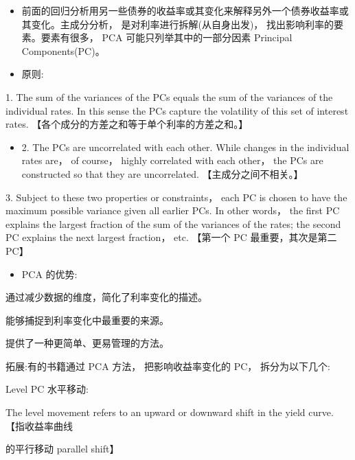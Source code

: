 \begin{itemize}
\item 前面的回归分析用另一些债券的收益率或其变化来解释另外一个债券收益率或其变化。主成分分析， 是对利率进行拆解(从自身出发)， 找出影响利率的要素。要素有很多， PCA 可能只列举其中的一部分因素 Principal Components(PC)。
\end{itemize}

\begin{itemize}
\item 原则:
\end{itemize}

1. The sum of the variances of the PCs equals the sum of the variances of the individual rates. In this sense the PCs capture the volatility of this set of interest rates. 【各个成分的方差之和等于单个利率的方差之和。】

\begin{itemize}
\item 2. The PCs are uncorrelated with each other. While changes in the individual rates are， of course， highly correlated with each other， the PCs are constructed so that they are uncorrelated. 【主成分之间不相关。】
\end{itemize}

3. Subject to these two properties or constraints， each PC is chosen to have the maximum possible variance given all earlier PCs. In other words， the first PC explains the largest fraction of the sum of the variances of the rates; the second PC explains the next largest fraction， etc. 【第一个 PC 最重要，其次是第二 PC】

\begin{itemize}
\item PCA 的优势:
\end{itemize}

通过减少数据的维度，简化了利率变化的描述。

能够捕捉到利率变化中最重要的来源。

提供了一种更简单、更易管理的方法。


拓展:有的书籍通过 PCA 方法， 把影响收益率变化的 PC， 拆分为以下几个:

\hspace*{3em} Level PC 水平移动:

\hspace*{1em} The level movement refers to an upward or downward shift in the yield curve. 【指收益率曲线

\hspace*{3em} 的平行移动 parallel shift】

